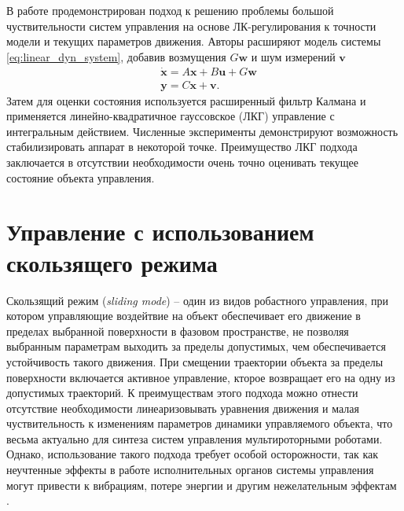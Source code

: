 В работе  \cite{Minh01} продемонстрирован подход к решению проблемы большой чуствительности систем управления на основе ЛК-регулирования к точности модели и текущих параметров движения. Авторы расширяют модель системы \eqref{eq:linear_dyn_system}, добавив возмущения $G \bm{w}$ и шум измерений $\bm{v}$
\begin{equation} \label{eq:linear_dyn_system_noisy}
\begin{aligned}
&\dot{\bm{x}} = A\bm{x} + B\bm{u} + G \bm{w}\\
&\bm{y} = C \bm{x} + \bm{v}.
\end{aligned}
\end{equation}
Затем для оценки состояния используется расширенный фильтр Калмана и применяется линейно-квадратичное гауссовское (ЛКГ) управление с интегральным действием. Численные эксперименты демонстрируют возможность стабилизировать аппарат в некоторой точке. Преимущество ЛКГ подхода заключается в отсутствии необходимости очень точно оценивать текущее состояние объекта управления.

\section{Управление с использованием скользящего режима}

Скользящий режим (\textit{sliding mode}) -- один из видов робастного управления, при котором управляющие воздейтвие на объект обеспечивает его движение в пределах выбранной поверхности в фазовом пространстве, не позволяя выбранным параметрам выходить за пределы допустимых, чем обеспечивается устойчивость такого движения.
При смещении траектории объекта за пределы поверхности включается активное управление, кторое возвращает его на одну из допустимых траекторий.
К преимуществам этого подхода можно отнести отсутствие необходимости линеаризовывать уравнения движения и малая чуствительность к изменениям параметров динамики управляемого объекта, что весьма актуально для синтеза систем управления мультироторными роботами.
Однако, использование такого подхода требует особой осторожности, так как неучтенные эффекты в работе исполнительных органов системы управления могут привести к вибрациям, потере энергии и другим нежелательным эффектам \cite{Utkin01}.

